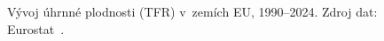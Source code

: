 \def\strVyhledPorodnostVyvojTitle{Úhrnná plodnost}%
\def\strVyhledPorodnostVyvojYlabel{živě narozených na ženu}%
\def\strVyhledPorodnostVyvojAnnotReplacement{hladina prosté reprodukce (\SI{2.1}{})}%
\def\strVyhledPorodnostVyvojCaption{Vývoj úhrnné plodnosti (\acs{TFR}) v~zemích \acs{EU}, 1990--2024. Zdroj dat: Eurostat~\cite{eurostat_demo_find}.}%
%

\providecommand\NudgeVyhledPorodnostVyvojCz{7pt}%
\providecommand\NudgeVyhledPorodnostVyvojAt{-13pt}%
\providecommand\NudgeVyhledPorodnostVyvojDe{-4pt}%
\providecommand\NudgeVyhledPorodnostVyvojSk{8pt}%
\providecommand\NudgeVyhledPorodnostVyvojPl{0pt}%
\providecommand\NudgeVyhledPorodnostVyvojDk{2pt}%

\providecommand\NudgeVyhledPorodnostVyvojDk{0pt}%
\begin{figure}[H]
  \centering
  
  \caption{\strVyhledPorodnostVyvojCaption}
  \label{fig:vyhled_porodnost_vyvoj}
\end{figure}
